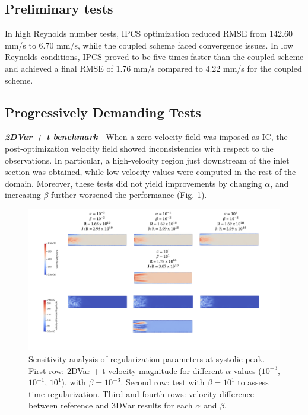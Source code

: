 \subsection*{Preliminary tests}
In high Reynolds number tests, IPCS optimization reduced RMSE from 142.60 mm/s to 6.70 mm/s, while the coupled scheme faced convergence issues. In low Reynolds conditions, IPCS proved to be five times faster than the coupled scheme and achieved a final RMSE of 1.76 mm/s compared to 4.22 mm/s for the coupled scheme.

\subsection*{Progressively Demanding Tests}
\textbf{\textit{2DVar + t benchmark}} - When a zero-velocity field was imposed as IC, the post-optimization velocity field showed inconsistencies with respect to the observations.
In particular, a high-velocity region just downstream of the inlet section was obtained, while low velocity values were computed in the rest of the domain.
Moreover, these tests did not yield improvements by changing \(\alpha\), and increasing \(\beta\) further worsened the performance (Fig. \ref{fig:3.3}).

\begin{figure}
    \centering
    \includegraphics[width=\textwidth]{chapters/paratico/Fig1.2.pdf}
    \caption{Sensitivity analysis of regularization parameters at systolic peak. First row: 2DVar + t velocity magnitude for different $\alpha$ values ($10^{-3}$, $10^{-1}$, $10^{1}$), with $\beta = 10^{-3}$. Second row: test with $\beta = 10^{1}$ to assess time regularization. Third and fourth rows: velocity difference between reference and 3DVar results for each $\alpha$ and $\beta$.}
    \label{fig:3.3}
\end{figure}

